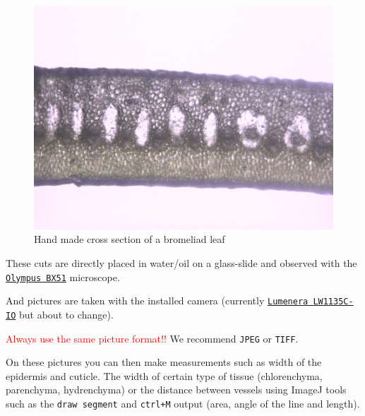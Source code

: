 \documentclass[
  12pt,
  american,
  a4paper,
  extrafontsizes,onecolumn,openright
  ]{memoir}
\begin{document}
\begin{figure}

{\centering \includegraphics[width=0.5\linewidth]{document/trait/shootmorpho/bromecut1} 

}

\caption{Hand made cross section of a bromeliad leaf}\label{fig:bromecut}
\end{figure}

\normalsize

These cuts are directly placed in water/oil on a glass-slide and observed with the \href{document/machine/Olympus\%20BX51/olympus_bx-51_bx52_microscope_manual.pdf}{\texttt{Olympus\ BX51}} microscope.

And pictures are taken with the installed camera (currently \href{document/machine/Lumenera\%20LW1135C-IO/Lumenera-USB-GigE-Camera-User-Manual.pdf}{\texttt{Lumenera\ LW1135C-IO}} but about to change).

\textcolor{red}{Always use the same picture format!!}
We recommend \texttt{JPEG} or \texttt{TIFF}.

On these pictures you can then make measurements such as width of the epidermis and cuticle.
The width of certain type of tissue (chlorenchyma, parenchyma, hydrenchyma) or the distance between vessels using ImageJ tools such as the \texttt{draw\ segment} and \texttt{ctrl+M} output (area, angle of the line and length).

\scriptsize
\end{document}
